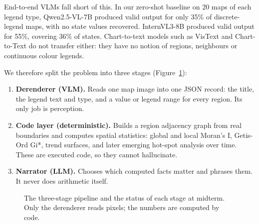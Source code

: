 \documentclass[11pt,a4paper]{article}
\begin{document}
End-to-end VLMs fall short of this. In our zero-shot baseline on 20 maps of each legend type, Qwen2.5-VL-7B produced valid output for only 35\% of discrete-legend maps, with no state values recovered. InternVL3-8B produced valid output for 55\%, covering 36\% of states. Chart-to-text models such as VisText and Chart-to-Text do not transfer either: they have no notion of regions, neighbours or continuous colour legends.

We therefore split the problem into three stages (Figure~\ref{fig:pipeline}):
\begin{enumerate}
\item \textbf{Derenderer (VLM).} Reads one map image into one JSON record: the title, the legend text and type, and a value or legend range for every region. Its only job is perception.
\item \textbf{Code layer (deterministic).} Builds a region adjacency graph from real boundaries and computes spatial statistics: global and local Moran's I, Getis-Ord Gi*, trend surfaces, and later emerging hot-spot analysis over time. These are executed code, so they cannot hallucinate.
\item \textbf{Narrator (LLM).} Chooses which computed facts matter and phrases them. It never does arithmetic itself.
\end{enumerate}

\begin{figure}[h]
\centering
{}
\caption{The three-stage pipeline and the status of each stage at midterm. Only the derenderer reads pixels; the numbers are computed by code.}
\label{fig:pipeline}
\end{figure}
\end{document}
